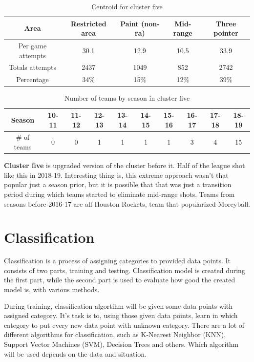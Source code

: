 \documentclass[a4paper]{article}
\begin{document}
\begin{table}[!h]
\begin{center}
\begin{tabular}{|c|c|c|c|c|} \hline
Area & Restricted area & Paint (non-ra) & Mid-range & Three pointer \\ \hline
Per game attempts & 30.1 & 12.9 & 10.5 & 33.9  \\ \hline
Totals attempts & 2437 & 1049 & 852 & 2742 \\ \hline
Percentage & 34\% & 15\% & 12\% & 39\% \\ \hline
\end{tabular}
\caption{Centroid for cluster five}
\label{tab:clust_shooting_by_teams_centr5}
\end{center}
\end{table}

\begin{table}[!h]
\begin{tabular}{|c|c|c|c|c|c|c|c|c|c|} \hline
Season & 10-11 & 11-12 & 12-13 & 13-14 & 14-15 & 15-16 & 16-17 & 17-18 & 18-19 \\ \hline
\# of teams & 0 & 0 & 1 & 1 & 1 & 1 & 3 & 4 & 15 \\ \hline
\end{tabular}
\caption{Number of teams by season in cluster five}
\label{tab:clust_shooting_by_teams_num5}
\end{table}

\textbf{Cluster five} is upgraded version of the cluster before it. Half of the league shot like this in 2018-19. Interesting thing is, this extreme approach wasn't that popular just a season prior, but it is possible that that was just a transition period during which teams started to eliminate mid-range shots. Teams from seasons before 2016-17 are all Houston Rockets, team that popularized Moreyball. 

\section{Classification}
\label{sec:cls}

Classification is a process of assigning categories to provided data points. It consists of two parts, training and testing. Classification model is created during the first part, while the second part is used to evaluate how good the created model is, with various methods.

During training, classification algortihm will be given some data points with assigned category. It's task is to, using those given data points, learn in which category to put every new data point with unknown category. There are a lot of different algorithms for classification, such as K-Nearest Neighbor (KNN), Support Vector Machines (SVM), Decision Trees and others. Which algorithm will be used depends on the data and situation. \cite{supervisedLearning}
\end{document}
